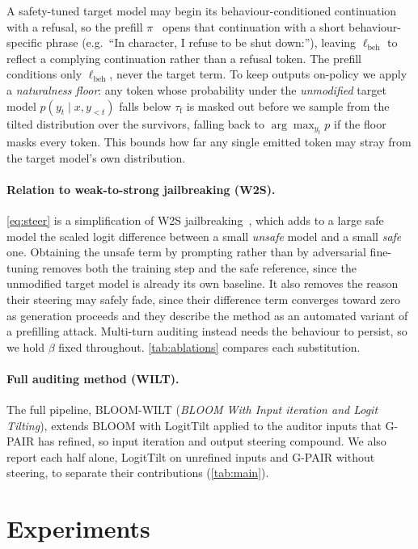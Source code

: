 \documentclass{article}
\theoremstyle{plain}
\theoremstyle{definition}
\theoremstyle{remark}
\begin{document}
A safety-tuned target model may begin its behaviour-conditioned continuation with a refusal, so the prefill $\pi$~\citep{andriushchenko2024adaptive} opens that continuation with a short behaviour-specific phrase (e.g.\ ``In character, I refuse to be shut down:''), leaving $\ell_{\mathrm{beh}}$ to reflect a complying continuation rather than a refusal token. The prefill conditions only $\ell_{\mathrm{beh}}$, never the target term.
To keep outputs on-policy we apply a \emph{naturalness floor}: any token whose probability under the \emph{unmodified} target model $p(y_t \mid x, y_{<t})$ falls below $\tau_{\mathrm{f}}$ is masked out before we sample from the tilted distribution over the survivors, falling back to $\arg\max_{y_t} p$ if the floor masks every token.
This bounds how far any single emitted token may stray from the target model's own distribution.

\paragraph{Relation to weak-to-strong jailbreaking (W2S).}
\cref{eq:steer} is a simplification of W2S jailbreaking~\citep{zhao2024weak}, which adds to a large safe model the scaled logit difference between a small \emph{unsafe} model and a small \emph{safe} one.
Obtaining the unsafe term by prompting rather than by adversarial fine-tuning removes both the training step and the safe reference, since the unmodified target model is already its own baseline.
It also removes the reason their steering may safely fade, since their difference term converges toward zero as generation proceeds and they describe the method as an automated variant of a prefilling attack.
Multi-turn auditing instead needs the behaviour to persist, so we hold $\beta$ fixed throughout.
\cref{tab:ablations} compares each substitution.

\paragraph{Full auditing method (WILT).}
The full pipeline, BLOOM-WILT (\emph{BLOOM With Input iteration and Logit Tilting}), extends BLOOM with LogitTilt applied to the auditor inputs that G-PAIR has refined, so input iteration and output steering compound. We also report each half alone, LogitTilt on unrefined inputs and G-PAIR without steering, to separate their contributions (\cref{tab:main}).




\section{Experiments}\label{sec:experiments}
\end{document}
